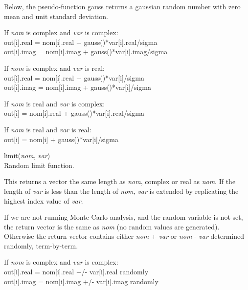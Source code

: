 \begin{description}
Below, the pseudo-function {\vt gauss} returns a gaussian random
number with zero mean and unit standard deviation.

\begin{description}
\item{If {\it nom} is complex and {\it var} is complex:}\\
  {\vt out[i].real = nom[i].real + gauss()*var[i].real/sigma}\\
  {\vt out[i].imag = nom[i].imag + gauss()*var[i].imag/sigma}

\item{If {\it nom} is complex and {\it var} is real:}\\
  {\vt out[i].real = nom[i].real + gauss()*var[i]/sigma}\\
  {\vt out[i].imag = nom[i].imag + gauss()*var[i]/sigma}

\item{If {\it nom} is real and {\it var} is complex:}\\
  {\vt out[i] = nom[i].real + gauss()*var[i].real/sigma}

\item{If {\it nom} is real and {\it var} is real:}\\
  {\vt out[i] = nom[i] + gauss()*var[i]/sigma}
\end{description}

\item{\vt limit}({\it nom\/}, {\it var\/})\\
Random limit function.

This returns a vector the same length as {\it nom\/}, complex or real
as {\it nom\/}.  If the length of {\it var} is less than the length of
{\it nom\/}, {\it var} is extended by replicating the highest index
value of {\it var\/}.

If we are not running Monte Carlo analysis, and the {\et random}
variable is not set, the return vector is the same as {\it nom} (no
random values are generated).  Otherwise the return vector contains
either {\it nom} + {\it var} or {\it nom} - {\it var} determined
randomly, term-by-term.

\begin{description}
\item{If {\it nom} is complex and {\it var} is complex:}\\
  {\vt out[i].real = nom[i].real +/- var[i].real} randomly\\
  {\vt out[i].imag = nom[i].imag +/- var[i].imag} randomly


\end{description}
\end{description}
